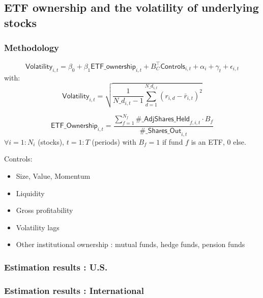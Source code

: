 \documentclass[handout, 9pt, usenames, dvipsnames]{beamer}
\begin{document}
\subsection{ETF ownership and the volatility of underlying stocks}
\begin{frame}
  \frametitle{Methodology}
\begin{equation}
  \mathsf{Volatility}_{i,t} = \beta_{0} + \beta_{1} \mathsf{ETF\_ownership}_{i, t} + B_{C}^{\intercal} \mathsf{Controls}_{i, t} + \alpha_{i} + \gamma_{t} + \epsilon_{i, t}
\end{equation}
with:
\begin{equation*}
  \mathsf{Volatility}_{i, t} = \sqrt{\frac{1}{N\_d_{i, t} - 1} \sum_{d = 1}^{N\_d_{i, t}} (r_{i, d} - \bar{r}_{i, t})^2}
  \end{equation*}

\begin{equation*}
  \mathsf{ETF\_Ownership}_{i, t} = \frac{\sum_{f = 1}^{N_{f}} \mathsf{\#\_AdjShares\_Held}_{f, i, t}\cdot B_{f}}{\mathsf{\#\_Shares\_Out}_{i, t}}
\end{equation*}
$\forall i = 1:N_{i}$ (stocks), $t = 1:T$ (periods)
with $B_{f} = 1$ if fund $f$ is an ETF, $0$ else.

Controls:
\begin{itemize}
\item Size, Value, Momentum
\item Liquidity
\item Gross profitability
\item Volatility lags
\item Other institutional ownership : mutual funds, hedge funds, pension funds
\end{itemize}
\end{frame}

\begin{frame}
  \frametitle{Estimation results : U.S.}
  \centering
  
\end{frame}

\begin{frame}
  \frametitle{Estimation results : International}
  \centering
  
\end{frame}
\end{document}
